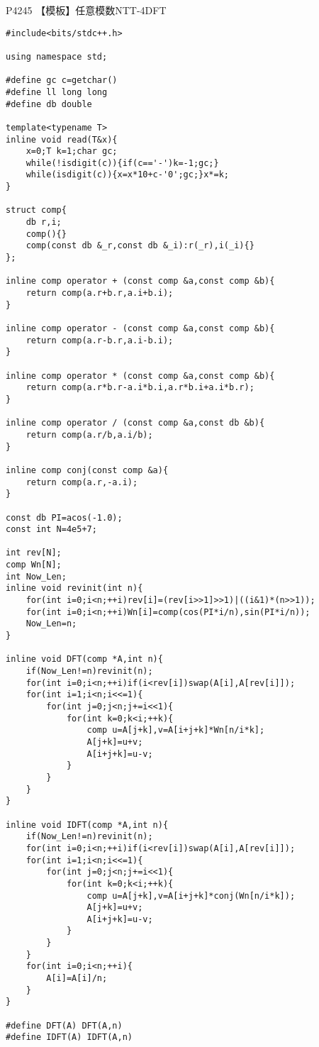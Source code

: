 \documentclass{ctexart}
\begin{document}
P4245 【模板】任意模数NTT-4DFT
\begin{lstlisting}
#include<bits/stdc++.h>

using namespace std;

#define gc c=getchar()
#define ll long long
#define db double 

template<typename T>
inline void read(T&x){
    x=0;T k=1;char gc;
    while(!isdigit(c)){if(c=='-')k=-1;gc;}
    while(isdigit(c)){x=x*10+c-'0';gc;}x*=k;
}

struct comp{
    db r,i;
    comp(){}
    comp(const db &_r,const db &_i):r(_r),i(_i){}
};

inline comp operator + (const comp &a,const comp &b){
    return comp(a.r+b.r,a.i+b.i);
}

inline comp operator - (const comp &a,const comp &b){
    return comp(a.r-b.r,a.i-b.i);
}

inline comp operator * (const comp &a,const comp &b){
    return comp(a.r*b.r-a.i*b.i,a.r*b.i+a.i*b.r);
}

inline comp operator / (const comp &a,const db &b){
    return comp(a.r/b,a.i/b);
}

inline comp conj(const comp &a){
    return comp(a.r,-a.i);
}

const db PI=acos(-1.0);
const int N=4e5+7;

int rev[N];
comp Wn[N];
int Now_Len;
inline void revinit(int n){
    for(int i=0;i<n;++i)rev[i]=(rev[i>>1]>>1)|((i&1)*(n>>1));
    for(int i=0;i<n;++i)Wn[i]=comp(cos(PI*i/n),sin(PI*i/n));
    Now_Len=n;
}

inline void DFT(comp *A,int n){
    if(Now_Len!=n)revinit(n);
    for(int i=0;i<n;++i)if(i<rev[i])swap(A[i],A[rev[i]]);
    for(int i=1;i<n;i<<=1){
        for(int j=0;j<n;j+=i<<1){
            for(int k=0;k<i;++k){
                comp u=A[j+k],v=A[i+j+k]*Wn[n/i*k];
                A[j+k]=u+v;
                A[i+j+k]=u-v;
            }
        }
    }
}

inline void IDFT(comp *A,int n){
    if(Now_Len!=n)revinit(n);
    for(int i=0;i<n;++i)if(i<rev[i])swap(A[i],A[rev[i]]);
    for(int i=1;i<n;i<<=1){
        for(int j=0;j<n;j+=i<<1){
            for(int k=0;k<i;++k){
                comp u=A[j+k],v=A[i+j+k]*conj(Wn[n/i*k]);
                A[j+k]=u+v;
                A[i+j+k]=u-v;
            }
        }
    }
    for(int i=0;i<n;++i){
    	A[i]=A[i]/n;
    }
}

#define DFT(A) DFT(A,n)
#define IDFT(A) IDFT(A,n)


\end{lstlisting}
\end{document}
